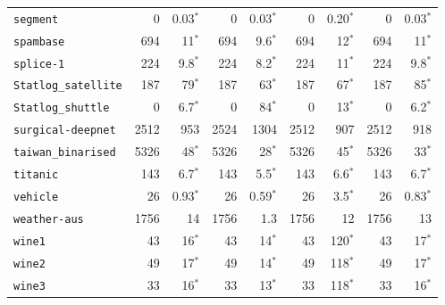 \begin{tabular}{lrrrrrrrr}
\texttt{segment} & 0 & 0.03$^*$ & 0 & 0.03$^*$ & 0 & 0.20$^*$ & 0 & 0.03$^*$\\
\texttt{spambase} & 694 & 11$^*$ & 694 & 9.6$^*$ & 694 & 12$^*$ & 694 & 11$^*$\\
\texttt{splice-1} & 224 & 9.8$^*$ & 224 & 8.2$^*$ & 224 & 11$^*$ & 224 & 9.8$^*$\\
\texttt{Statlog\_satellite} & 187 & 79$^*$ & 187 & 63$^*$ & 187 & 67$^*$ & 187 & 85$^*$\\
\texttt{Statlog\_shuttle} & 0 & 6.7$^*$ & 0 & 84$^*$ & 0 & 13$^*$ & 0 & 6.2$^*$\\
\texttt{surgical-deepnet} & 2512 & 953 & 2524 & 1304 & 2512 & 907 & 2512 & 918\\
\texttt{taiwan\_binarised} & 5326 & 48$^*$ & 5326 & 28$^*$ & 5326 & 45$^*$ & 5326 & 33$^*$\\
\texttt{titanic} & 143 & 6.7$^*$ & 143 & 5.5$^*$ & 143 & 6.6$^*$ & 143 & 6.7$^*$\\
\texttt{vehicle} & 26 & 0.93$^*$ & 26 & 0.59$^*$ & 26 & 3.5$^*$ & 26 & 0.83$^*$\\
\texttt{weather-aus} & 1756 & 14 & 1756 & 1.3 & 1756 & 12 & 1756 & 13\\
\texttt{wine1} & 43 & 16$^*$ & 43 & 14$^*$ & 43 & 120$^*$ & 43 & 17$^*$\\
\texttt{wine2} & 49 & 17$^*$ & 49 & 14$^*$ & 49 & 118$^*$ & 49 & 17$^*$\\
\texttt{wine3} & 33 & 16$^*$ & 33 & 13$^*$ & 33 & 118$^*$ & 33 & 16$^*$\\
\bottomrule
\end{tabular}

